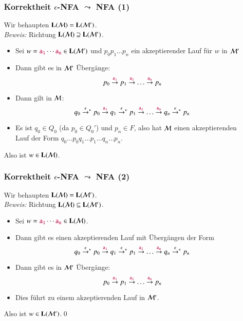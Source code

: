 \documentclass[onlymath]{beamer}
\begin{document}
\begin{frame}

\end{frame}

\begin{frame}[t]\frametitle{Korrektheit $\epsilon$-NFA $\leadsto$ NFA (1)}

Wir behaupten $\textbf{\textcolor{black}{L}}(\mathcal{M})=\textbf{\textcolor{black}{L}}(\mathcal{M}')$.\\[1ex]

\emph{Beweis:} Richtung $\textbf{\textcolor{black}{L}}(\mathcal{M})\supseteq\textbf{\textcolor{black}{L}}(\mathcal{M}')$.\pause

\begin{itemize}
\item Sei $w=\mathtt{\textcolor{purple}{a_1}}\cdots\mathtt{\textcolor{purple}{a_n}}\in \textbf{\textcolor{black}{L}}(\mathcal{M'})$ und $p_0p_1\ldots p_n$ ein akzeptierender Lauf für $w$ in $\mathcal{M'}$\pause
\item Dann gibt es in $\mathcal{M}'$ Übergänge:
\[ p_0\stackrel{\mathtt{\textcolor{purple}{a_1}}}{\to}p_1\stackrel{\mathtt{\textcolor{purple}{a_2}}}{\to}\ldots\stackrel{\mathtt{\textcolor{purple}{a_n}}}{\to}p_n\]\pause
\item Dann gilt in $\mathcal{M}$:
\[ q_0\mathrel{\mathord{\stackrel{\epsilon}{\to}}{}^*} p_0\stackrel{\mathtt{\textcolor{purple}{a_1}}}{\to}q_1\mathrel{\mathord{\stackrel{\epsilon}{\to}}{}^*} p_1\stackrel{\mathtt{\textcolor{purple}{a_2}}}{\to}\ldots\stackrel{\mathtt{\textcolor{purple}{a_n}}}{\to}q_n\mathrel{\mathord{\stackrel{\epsilon}{\to}}{}^*} p_n\]\pause
\item Es ist $q_0\in Q_0$ (da $p_0\in Q_0'$) und $p_n\in F$, also hat $\mathcal{M}$ einen akzeptierenden Lauf der Form $q_0\ldots p_0q_1\ldots p_1\ldots q_n\ldots p_n$.\pause
\end{itemize}
Also ist $w\in\textbf{\textcolor{black}{L}}(\mathcal{M})$.

\end{frame}

\begin{frame}[t]\frametitle{Korrektheit $\epsilon$-NFA $\leadsto$ NFA (2)}

Wir behaupten $\textbf{\textcolor{black}{L}}(\mathcal{M})=\textbf{\textcolor{black}{L}}(\mathcal{M}')$.\\[1ex]

\emph{Beweis:} Richtung $\textbf{\textcolor{black}{L}}(\mathcal{M})\subseteq\textbf{\textcolor{black}{L}}(\mathcal{M}')$.\pause

\begin{itemize}
\item Sei $w=\mathtt{\textcolor{purple}{a_1}}\cdots\mathtt{\textcolor{purple}{a_n}}\in \textbf{\textcolor{black}{L}}(\mathcal{M})$.
\item Dann gibt es einen akzeptierenden Lauf mit Übergängen der Form
\[ q_0\mathrel{\mathord{\stackrel{\epsilon}{\to}}{}^*} p_0\stackrel{\mathtt{\textcolor{purple}{a_1}}}{\to}q_1\mathrel{\mathord{\stackrel{\epsilon}{\to}}{}^*} p_1\stackrel{\mathtt{\textcolor{purple}{a_2}}}{\to}\ldots\stackrel{\mathtt{\textcolor{purple}{a_n}}}{\to}q_n\mathrel{\mathord{\stackrel{\epsilon}{\to}}{}^*} p_n\]
\item Dann gibt es in $\mathcal{M}'$ Übergänge:
\[ p_0\stackrel{\mathtt{\textcolor{purple}{a_1}}}{\to}p_1\stackrel{\mathtt{\textcolor{purple}{a_2}}}{\to}\ldots\stackrel{\mathtt{\textcolor{purple}{a_n}}}{\to}p_n\]
\item Dies führt zu einem akzeptierenden Lauf in $\mathcal{M}'$.
\end{itemize}
Also ist $w\in\textbf{\textcolor{black}{L}}(\mathcal{M}')$.\qed

\end{frame}
\end{document}
